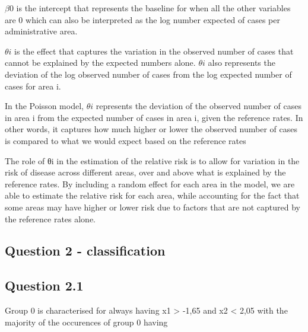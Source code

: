 \documentclass[
  letterpaper,
  DIV=11,
  numbers=noendperiod]{scrartcl}
\begin{document}
\(\beta0\) is the intercept that represents the baseline for when all
the other variables are 0 which can also be interpreted as the log
number expected of cases per administrative area.

\(\theta i\) is the effect that captures the variation in the observed
number of cases that cannot be explained by the expected numbers alone.
\(\theta i\) also represents the deviation of the log observed number of
cases from the log expected number of cases for area i.

In the Poisson model, \(\theta i\) represents the deviation of the
observed number of cases in area i from the expected number of cases in
area i, given the reference rates. In other words, it captures how much
higher or lower the observed number of cases is compared to what we
would expect based on the reference rates

The role of θi in the estimation of the relative risk is to allow for
variation in the risk of disease across different areas, over and above
what is explained by the reference rates. By including a random effect
for each area in the model, we are able to estimate the relative risk
for each area, while accounting for the fact that some areas may have
higher or lower risk due to factors that are not captured by the
reference rates alone.

\hypertarget{question-2---classification}{%
\subsection{Question 2 -
classification}\label{question-2---classification}}

\hypertarget{question-2.1}{%
\subsection{Question 2.1}\label{question-2.1}}

Group 0 is characterised for always having x1 \textgreater{} -1,65 and
x2 \textless{} 2,05 with the majority of the occurences of group 0
having
\end{document}
